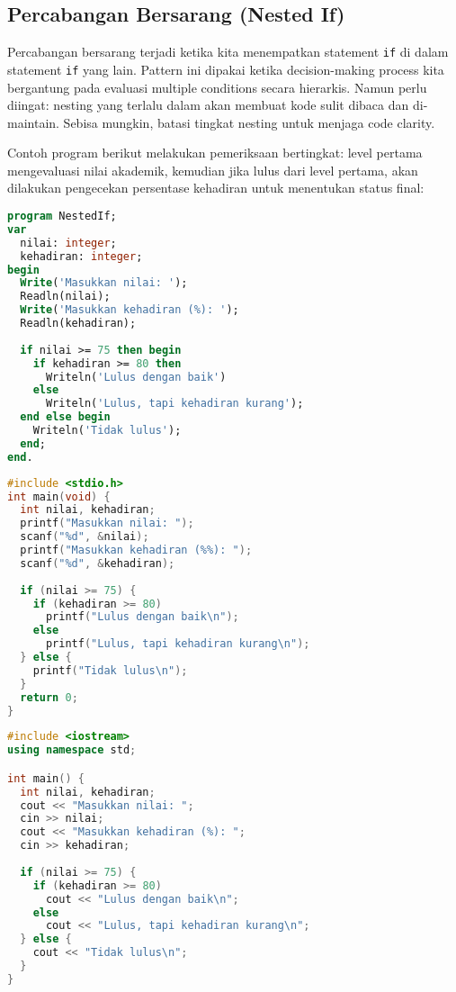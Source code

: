 \documentclass[../main.tex]{subfiles}
\begin{document}
\subsection{Percabangan Bersarang (Nested If)}
Percabangan bersarang terjadi ketika kita menempatkan statement \texttt{if} di dalam statement \texttt{if} yang lain. Pattern ini dipakai ketika decision-making process kita bergantung pada evaluasi multiple conditions secara hierarkis. Namun perlu diingat: nesting yang terlalu dalam akan membuat kode sulit dibaca dan di-maintain. Sebisa mungkin, batasi tingkat nesting untuk menjaga code clarity.

Contoh program berikut melakukan pemeriksaan bertingkat: level pertama mengevaluasi nilai akademik, kemudian jika lulus dari level pertama, akan dilakukan pengecekan persentase kehadiran untuk menentukan status final:

\begin{lstlisting}[language=Pascal, caption={Nested if di Pascal}]
program NestedIf;
var
  nilai: integer;
  kehadiran: integer;
begin
  Write('Masukkan nilai: ');
  Readln(nilai);
  Write('Masukkan kehadiran (%): ');
  Readln(kehadiran);
  
  if nilai >= 75 then begin
    if kehadiran >= 80 then
      Writeln('Lulus dengan baik')
    else
      Writeln('Lulus, tapi kehadiran kurang');
  end else begin
    Writeln('Tidak lulus');
  end;
end.
\end{lstlisting}

\begin{lstlisting}[language=C, caption={Nested if di C}]
#include <stdio.h>
int main(void) {
  int nilai, kehadiran;
  printf("Masukkan nilai: ");
  scanf("%d", &nilai);
  printf("Masukkan kehadiran (%%): ");
  scanf("%d", &kehadiran);
  
  if (nilai >= 75) {
    if (kehadiran >= 80)
      printf("Lulus dengan baik\n");
    else
      printf("Lulus, tapi kehadiran kurang\n");
  } else {
    printf("Tidak lulus\n");
  }
  return 0;
}
\end{lstlisting}

\begin{lstlisting}[language=C++, caption={Nested if di C++}]
#include <iostream>
using namespace std;

int main() {
  int nilai, kehadiran;
  cout << "Masukkan nilai: ";
  cin >> nilai;
  cout << "Masukkan kehadiran (%): ";
  cin >> kehadiran;
  
  if (nilai >= 75) {
    if (kehadiran >= 80)
      cout << "Lulus dengan baik\n";
    else
      cout << "Lulus, tapi kehadiran kurang\n";
  } else {
    cout << "Tidak lulus\n";
  }
}
\end{lstlisting}
\end{document}
